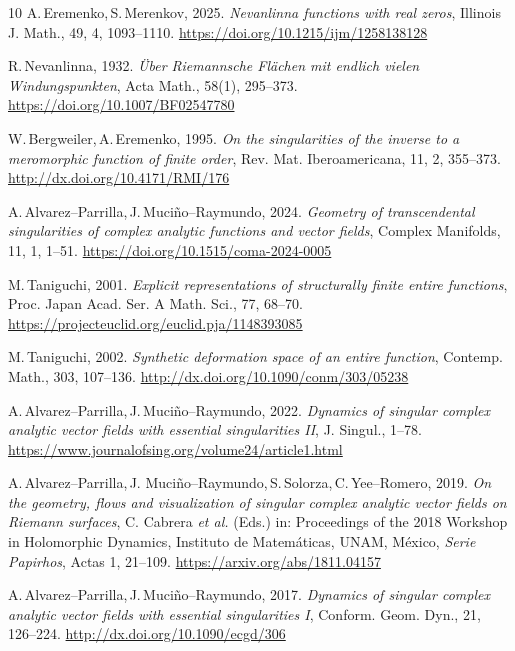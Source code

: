\documentclass[final,3p,times]{elsarticle}
\theoremstyle{definition}
\begin{document}
\begin{thebibliography}{10}
A.\,Eremenko,\,S.\,Merenkov, 
2025.
\emph{Nevanlinna functions with real zeros}, 
Illinois J. Math., 
49, 4, 1093--1110. 
\url{https://doi.org/10.1215/ijm/1258138128}

R.\,Nevanlinna, 1932.
\emph{\"Uber Riemannsche Fl\"achen mit endlich vielen Windungspunkten}, 
Acta Math., 58(1), 
295--373.
\url{https://doi.org/10.1007/BF02547780}

W.\,Bergweiler,\,A.\,Eremenko,
1995.
\emph{On the singularities of the inverse to a 
meromorphic function of finite order},
Rev. Mat. Iberoamericana,  
11, 2, 
355--373.
\url{http://dx.doi.org/10.4171/RMI/176}

\newblock A.\,Alvarez--Parrilla,\,J.\,Muci\~no--Raymundo, 
2024.
\emph{Geometry of transcendental 
singularities of complex analytic functions and vector fields}, 
Complex Manifolds, 
11, 1,
1--51.
\url{https://doi.org/10.1515/coma-2024-0005}

M.\,Taniguchi,
2001. 
\emph{Explicit representations of structurally finite entire functions},
Proc. Japan Acad. Ser. A Math. Sci.,
77, 
68--70.
\url{https://projecteuclid.org/euclid.pja/1148393085}

M.\,Taniguchi, 
2002.
\emph{Synthetic deformation space of an entire function},
Contemp. Math., 
303, 
107--136.
\url{http://dx.doi.org/10.1090/conm/303/05238}

\newblock A.\,Alvarez--Parrilla,\,J.\,Muci\~no--Raymundo,
2022. 
\emph{Dynamics of singular complex analytic vector fields with 
essential singularities II}, 
J. Singul.,
1--78.
\url{https://www.journalofsing.org/volume24/article1.html}

A.\,Alvarez--Parrilla,\,J. Muci\~no--Raymundo,\,S.\,Solorza,\,C.\,Yee--Romero, 
2019.
\emph{On the geometry, flows and visualization of 
singular complex analytic vector fields on Riemann surfaces},
C. Cabrera {\it et al.} (Eds.) in:
Proceedings of the 2018 Workshop in Holomorphic Dynamics, 
Instituto de Matem\'aticas, UNAM, M\'exico, \emph{Serie Papirhos}, Actas 1, 
21--109.
\url{https://arxiv.org/abs/1811.04157}

A.\,Alvarez--Parrilla,\,J.\,Muci\~no--Raymundo,
2017. 
\emph{Dynamics of singular complex analytic vector fields with 
essential singularities I}, 
Conform. Geom. Dyn., 
21, 
126--224.
\url{http://dx.doi.org/10.1090/ecgd/306}


\end{thebibliography}
\end{document}
